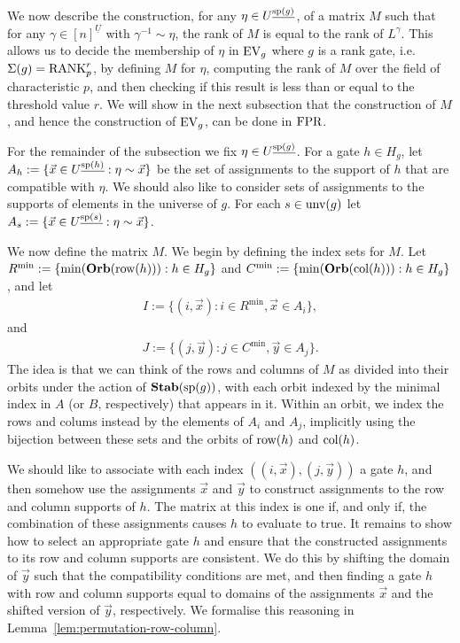 \documentclass[../paper.tex]{subfiles}
\begin{document}
We now describe the construction, for any $\eta \in U^{\underline{\text{sp}(g)}}$, of a matrix
$M$ such that for any $\gamma \in [n]^{\underline{U}}$ with $\gamma^{-1} \sim
\eta$, the rank of $M$ is equal to the rank of $L^{\gamma}$. This allows us to
decide the membership of $\eta$ in $\text{EV}_g$ where $g$ is a rank gate, i.e.\
$\Sigma(g) = \text{\upshape RANK}^r_p$, by defining $M$ for $\eta$, computing the rank of $M$
over the field of characteristic $p$, and then checking if this result is less
than or equal to the threshold value $r$. We will show in the next subsection
that the construction of $M$, and hence the construction of $\text{EV}_g$, can be done
in $\text{\upshape FPR}$.

For the remainder of the subsection we fix $\eta \in U^{\underline{\text{sp}(g)}}$.
For a gate $h \in H_g$, let $A_h := \{\vec{x} \in U^{\underline{\text{sp}(h)}} :
\eta \sim \vec{x}\}$ be the set of assignments to the support of $h$ that are
compatible with $\eta$. We should also like to consider sets of assignments to
the supports of elements in the universe of $g$.  For each $s \in \text{unv}(g)$
let $A_s := \{\vec{x} \in U^{\underline{\text{sp}(s)}} : \eta \sim \vec{x}\}$.

We now define the matrix $M$. We begin by defining the index sets for $M$. Let
$R^{\min} := \{\min (\text{\textbf{Orb}}(\text{row}(h))) : h \in H_g\}$ and $C^{\min} := \{ \min
(\text{\textbf{Orb}} (\text{col}(h))) : h \in H_g\}$, and let
\begin{align*}
	I := \{(i, \vec{x}): i \in R^{\min}, \vec{x} \in A_i\}, 
\end{align*}
and
\begin{align*}
	J := \{(j, \vec{y}): j \in C^{\min}, \vec{y} \in A_j\}. 
\end{align*}
The idea is that we can think of the rows and columns of $M$ as
divided into their orbits under the action of $\text{\textbf{Stab}}(\text{sp}(g))$, with
each orbit indexed by the minimal index in $A$ (or $B$, respectively)
that appears in it.  Within an orbit, we index the rows and colums
instead by the elements of $A_i$ and $A_j$, implicitly using the
bijection between these sets and the orbits of $\text{row}(h)$ and
$\text{col}(h)$. 

We should like to associate with each index $((i, \vec{x}), (j, \vec{y}))$ a
gate $h$, and then somehow use the assignments $\vec{x}$ and $\vec{y}$ to
construct assignments to the row and column supports of $h$. The matrix at this
index is one if, and only if, the combination of these assignments causes $h$ to
evaluate to true. It remains to show how to select an appropriate gate $h$ and
ensure that the constructed assignments to its row and column supports are
consistent. We do this by shifting the domain of $\vec{y}$ such that the
compatibility conditions are met, and then finding a gate $h$ with row and
column supports equal to domains of the assignments $\vec{x}$ and the shifted
version of $\vec{y}$, respectively. We formalise this reasoning in
Lemma~\ref{lem:permutation-row-column}.
\end{document}
